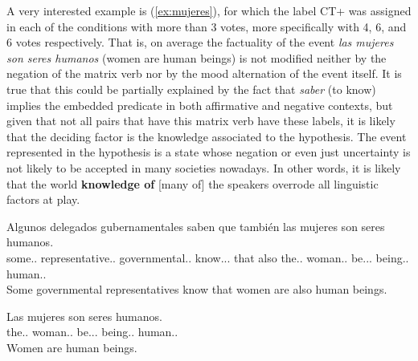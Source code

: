 A very interested example is (\ref{ex:mujeres}), for which the label CT+ was assigned in each of the conditions with more than 3 votes, more specifically with 4, 6, and 6 votes respectively. That is, on average the factuality of the event \textit{las mujeres son seres humanos} (women are human beings) is not modified neither by the negation of the matrix verb nor by the mood alternation of the event itself. It is true that this could be partially explained by the fact that \textit{saber} (to know) implies the embedded predicate in both affirmative and negative contexts, but given that not all pairs that have this matrix verb have these labels, it is likely that the deciding factor is the knowledge associated to the hypothesis. The event represented in the hypothesis is a state whose negation or even just uncertainty is not likely to be accepted in many societies nowadays. In other words, it is likely that the world \textbf{knowledge of} [many of]  the speakers overrode all linguistic factors at play.\\

\begin{exe}
  \ex\label{ex:mujeres}
    \begin{xlist}
      \item{\gll Algunos delegados gubernamentales saben que también las mujeres son seres humanos.\\ some.\M.\Pl{} representative.\M.\Pl{} governmental.\M.\Pl{} know.\Prs.\Ind.\Tsg{} that also the.\F.\Pl{} woman.\F.\Pl{} be.\Prs.\Ind.\Tpl{} being.\M.\Pl{} human.\M.\Pl{} \\\glt Some governmental representatives know that women are also human beings.}
      \item{\gll Las mujeres son seres humanos.\\ the.\F.\Pl{} woman.\F.\Pl{} be.\Prs.\Ind.\Tpl{} being.\M.\Pl{} human.\M.\Pl{} \\\glt Women are human beings.} \label{ex:hypmujeres}
    \end{xlist}
\end{exe}


